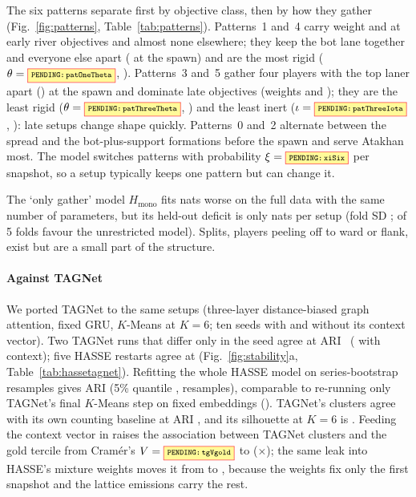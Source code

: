 The six patterns separate first by objective class, then by how they gather (Fig.~\ref{fig:patterns}, Table~\ref{tab:patterns}).
Patterns~1 and~4 carry weight  and  at early river objectives and almost none elsewhere; they keep the bot lane together and everyone else apart (\texttt{} at the spawn) and are the most rigid ($\theta=\V{patOneTheta}$, ).
Patterns~3 and~5 gather four players with the top laner apart (\texttt{}) at the spawn and dominate late objectives (weights  and ); they are the least rigid ($\theta=\V{patThreeTheta}$, ) and the least inert ($\iota=\V{patThreeIota}$, ): late setups change shape quickly.
Patterns~0 and~2 alternate between the spread and the bot-plus-support formations before the spawn and serve Atakhan most.
The model switches patterns with probability $\xi=\V{xiSix}$ per snapshot, so a setup typically keeps one pattern but can change it.

The `only gather' model $H_{\mathrm{mono}}$ fits  nats worse on the full data with the same number of parameters, but its held-out deficit is only  nats per setup (fold SD ;  of 5 folds favour the unrestricted model).
Splits, players peeling off to ward or flank, exist but are a small part of the structure.


\paragraph*{Against TAGNet}
We ported TAGNet to the same setups (three-layer distance-biased graph attention, fixed GRU, $K$-Means at $K=6$; ten seeds with and without its context vector).
Two TAGNet runs that differ only in the seed agree at ARI~\cite{hubert1985comparing}  ( with context); five HASSE restarts agree at  (Fig.~\ref{fig:stability}a, Table~\ref{tab:hassetagnet}).
Refitting the whole HASSE model on series-bootstrap resamples gives ARI  (5\% quantile ,  resamples), comparable to re-running only TAGNet's final $K$-Means step on fixed embeddings ().
TAGNet's clusters agree with its own counting baseline at ARI , and its silhouette at $K=6$ is .
Feeding the context vector in raises the association between TAGNet clusters and the gold tercile from Cramér's $V=\V{tgVgold}$ to  ($\times$); the same leak into HASSE's mixture weights moves it from  to , because the weights fix only the first snapshot and the lattice emissions carry the rest.

